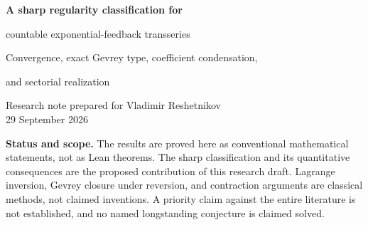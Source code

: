 \documentclass[11pt,a4paper]{article}
\numberwithin{equation}{section}
\theoremstyle{definition}
\theoremstyle{remark}
\newcommand{\Borel}{\mathcal B}
\newcommand{\Uhat}{\widehat U}
\begin{document}
\begin{center}
{\LARGE\bfseries\color{ink} A sharp regularity classification for\par countable exponential-feedback transseries\par}
\vspace{0.6em}
{\large Convergence, exact Gevrey type, coefficient condensation,\par and sectorial realization}
\vspace{0.8em}

Research note prepared for Vladimir Reshetnikov\\
29 September 2026
\end{center}

\begin{abstract}
We study the formally well-defined equation
\[
 \Uhat(q)=\sum_{j\ge1}q^j\exp\!\bigl(\lambda_j\Uhat(q)\bigr),
 \qquad \lambda_j\ge0,
\]
as a model of countably many exponentially delayed corrections in transseries
inversion.  Formal existence alone imposes no growth restriction on the slopes
$\lambda_j$.  We derive a sharp separation between formal, analytic, and
Gevrey regularity.  The solution has positive radius of convergence exactly
when $\lambda_j=O(j)$.  More precisely, writing
$\Uhat=\sum_{n\ge1}u_nq^n$, for every $s>0$ we prove the exact identity
\[
 \limsup_{n\to\infty}\left(\frac{u_n}{(n!)^s}\right)^{1/n}
 =\left(\frac{s+1}{s}\right)^{s+1}
   \limsup_{j\to\infty}
      \frac{\lambda_j}{\bigl(j\log j\bigr)^{s+1}}.
\]
For $\lambda_j\sim a j^p(\log j)^\beta$, $p>1$, we determine
$\log u_n$ through its term of order $n$, and prove concentration of the
Lagrange weights on configurations with one large action of size
$\frac{p}{p-1}\frac{n}{\log n}$.  The quadratic model has an entire ordinary
Borel transform with $\log\log\Borel\Uhat(t)\sim2\sqrt t$, hence is not
Borel--Laplace summable on the positive ray.  Nevertheless, every nonnegative
slope sequence, even one of superpolynomial growth, admits a holomorphic
solution with this Poincar\'e expansion on proper subsectors of the left
half-plane.  We give explicit action-truncation bounds, transfer the Gevrey
classification to formal compositional inverses, and provide exact-arithmetic
checks and a focused research program.
\end{abstract}

\noindent\textbf{Status and scope.}
The results are proved here as conventional mathematical statements, not as
Lean theorems.  The sharp classification and its quantitative consequences
are the proposed contribution of this research draft.  Lagrange inversion,
Gevrey closure under reversion, and contraction arguments are classical
methods, not claimed inventions.  A priority claim against the entire
literature is not established, and no named longstanding conjecture is
claimed solved.
\end{document}
